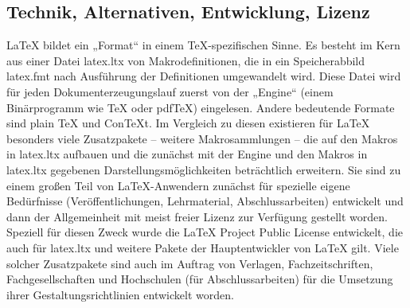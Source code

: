 \subsection{Technik, Alternativen, Entwicklung, Lizenz}
LaTeX bildet ein „Format“ in einem TeX-spezifischen Sinne. Es besteht im Kern aus einer Datei latex.ltx von Makrodefinitionen, die in ein Speicherabbild latex.fmt nach Ausführung der Definitionen umgewandelt wird. Diese Datei wird für jeden Dokumenterzeugungslauf zuerst von der „Engine“ (einem Binärprogramm wie TeX oder pdfTeX) eingelesen. Andere bedeutende Formate sind plain TeX und ConTeXt. Im Vergleich zu diesen existieren für LaTeX besonders viele Zusatzpakete – weitere Makrosammlungen – die auf den Makros in latex.ltx aufbauen und die zunächst mit der Engine und den Makros in latex.ltx gegebenen Darstellungsmöglichkeiten beträchtlich erweitern. Sie sind zu einem großen Teil von LaTeX-Anwendern zunächst für spezielle eigene Bedürfnisse (Veröffentlichungen, Lehrmaterial, Abschlussarbeiten) entwickelt und dann der Allgemeinheit mit meist freier Lizenz zur Verfügung gestellt worden. Speziell für diesen Zweck wurde die LaTeX Project Public License entwickelt, die auch für latex.ltx und weitere Pakete der Hauptentwickler von LaTeX gilt. Viele solcher Zusatzpakete sind auch im Auftrag von Verlagen, Fachzeitschriften, Fachgesellschaften und Hochschulen (für Abschlussarbeiten) für die Umsetzung ihrer Gestaltungsrichtlinien entwickelt worden.
